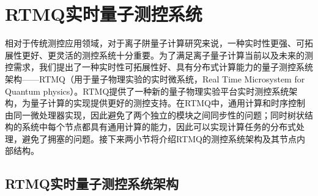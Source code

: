 




\section[RTMQ实时量子测控系统]{RTMQ实时量子测控系统\label{section:rtmq_structure}}

相对于传统测控应用领域，对于离子阱量子计算研究来说，一种实时性更强、可拓展性更好、更灵活的测控系统十分重要。为了满足离子量子计算当前以及未来的测控需求，我们提出了一种实时性可拓展性好、具有分布式计算能力的量子测控系统架构——RTMQ（用于量子物理实验的实时微系统，Real Time Microsystem for Quantum physics）。RTMQ提供了一种新的量子物理实验平台实时测控系统架构，为量子计算的实现提供更好的测控支持。在RTMQ中，通用计算和时序控制由同一微处理器实现，因此避免了两个独立的模块之间同步性的问题；同时树状结构的系统中每个节点都具有通用计算的能力，因此可以实现计算任务的分布式处理，避免了拥塞的问题\cite[]{junhua01}。接下来两小节将介绍RTMQ的测控系统架构及其节点内部结构。


\subsection[RTMQ实时量子测控系统架构]{RTMQ实时量子测控系统架构\label{section:rtmq_architecture}}

